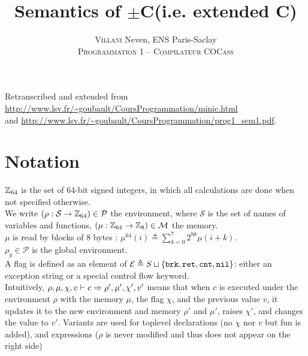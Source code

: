 

\newcommand{\Cmp}{\(\pm\)C}
\newcommand{\Cmm}{C\textminus\textminus}
\newcommand{\fun}{\text{fun}}
\newcommand{\gives}{\vdash}
\newcommand{\brk}{\t{brk}}
\newcommand{\ret}{\t{ret}}
\newcommand{\cnt}{\t{cnt}}
\newcommand{\nil}{\t{nil}}

\title{Semantics of \Cmp (i.e. extended \Cmm)}
\author{\textsc{Villani} Neven, ENS Paris-Saclay\\\textsc{Programmation 1 -- Compilateur COCass}}


\maketitle

Retranscribed and extended from \url{http://www.lsv.fr/~goubault/CoursProgrammation/minic.html}\\
and \url{http://www.lsv.fr/~goubault/CoursProgrammation/prog1_sem1.pdf}.\\


\section*{Notation}

\(\mathbb{Z}_{64}\) is the set of 64-bit signed integers, in which all calculations are done when not specified otherwise.\\

We write \((\rho: \mathcal{S}\to\mathbb{Z}_{64})\in \mathcal{P}\) the environment, where \(\mathcal{S}\) is the set of names of variables and functions, \((\mu: \mathbb{Z}_{64}\to\mathbb{Z}_{8})\in \mathcal{M}\) the memory.\\
\(\mu\) is read by blocks of 8 bytes : \(\mu^{64}(i) \triangleq \sum_{k=0}^7 2^{8k}\mu(i+k)\).\\
\(\rho_g\in\mathcal{P}\) is the global environment.\\

A flag is defined as an element of \(\mathcal{E} \triangleq S \sqcup \{ \brk, \ret, \cnt, \nil \}\): either an exception string or a special control flow keyword.\\
Intuitively, \(\rho,\mu,\chi,v \gives c \tto \rho',\mu',\chi',v'\) means that when \(c\) is executed under the environment \(\rho\) with the memory \(\mu\), the flag \(\chi\), and the previous value \(v\), it updates it to the new environment and memory \(\rho'\) and \(\mu'\), raises \(\chi'\), and changes the value to \(v'\). Variants are used for toplevel declarations (no \(\chi\) nor \(v\) but \(\fun\) is added), and expressions (\(\rho\) is never modified and thus does not appear on the right side)\\

